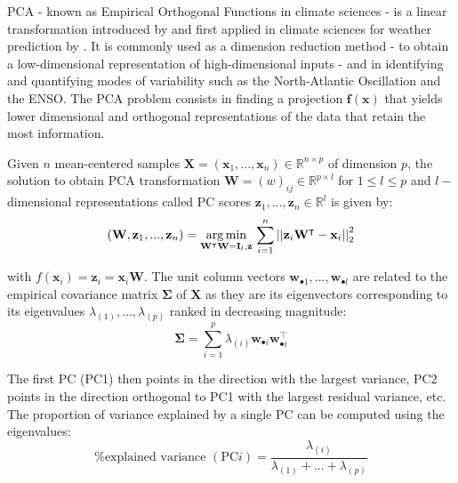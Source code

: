 \documentclass[11pt,a4paper,twoside,openright]{report}
\theoremstyle{definition}
\begin{document}
PCA - known as Empirical Orthogonal Functions in climate sciences - is a linear transformation introduced by \cite{pearson_liii_1901} and first applied in climate sciences for weather prediction by \cite{lorenz_empirical_1956}. It is commonly used as a dimension reduction method - to obtain a low-dimensional representation of high-dimensional inputs - and in identifying and quantifying modes of variability such as the North-Atlantic Oscillation and the ENSO. The PCA problem consists in finding a projection \(\mathbf{f}(\mathbf{x})\) that yields lower dimensional and orthogonal representations of the data that retain the most information.

Given \(n\) mean-centered samples \(\mathbf{X} = (\mathbf{x}_1, ..., \mathbf{x}_n) \in \mathbb{R}^{n \times p}\) of dimension \(p\), the solution to obtain PCA transformation \(\mathbf{W} = (w)_{ij} \in \mathbb{R}^{p \times l}\) for \(1 \leq l \leq p\) and \(l-\)dimensional representations called PC scores \(\mathbf{z}_1, ..., \mathbf{z}_{n} \in \mathbb{R}^l\) is given by:
\begin{equation}
(\mathbf{W}, \mathbf{z}_1, ..., \mathbf{z}_{n}) = \operatorname*{arg\, min}_{\mathbf{W}^{\intercal}\mathbf{W}=\mathbf{I}_l,\mathbf{z}} \, \sum_{i=1}^n \left|\left| \mathbf{z}_i  \mathbf{W}^{\intercal}- \mathbf{x}_i \right|\right|^2_2
\label{eq:pcatrans}
\end{equation}

with \(f(\mathbf{x}_i) = \mathbf{z}_i = \mathbf{x}_i \mathbf{W}\). The unit column vectors \(\mathbf{w}_{\bullet 1}, ...,  \mathbf{w}_{\bullet l}\) are related to the empirical covariance matrix \(\boldsymbol{\Sigma}\) of \(\mathbf{X}\) as they are its eigenvectors corresponding to its eigenvalues \(\lambda_{(1)}, ..., \lambda_{(p)}\) ranked in decreasing magnitude:
\begin{equation}
\boldsymbol{\Sigma} = \sum_{i=1}^p \lambda_{(i)} \mathbf{w}_{\bullet i} \mathbf{w}_{\bullet i}^{\intercal} 
\label{eq:pcacov}
\end{equation}

The first PC (PC1) then points in the direction with the largest variance, PC2 points in the direction orthogonal to PC1 with the largest residual variance, etc. The proportion of variance explained by a single PC can be computed using the eigenvalues:
\begin{equation}
\text{\% explained variance }(\text{PC}i) = \frac{\lambda_{(i)}}{\lambda_{(1)}+...+\lambda_{(p)}}
\label{eq:pcaexplvar}
\end{equation}
\end{document}
